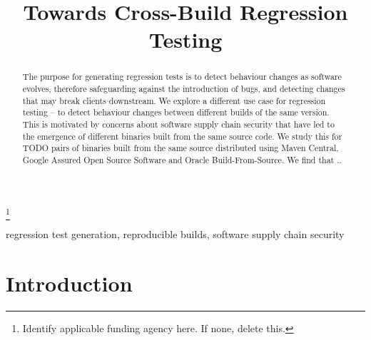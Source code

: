 \documentclass[conference]{IEEEtran}
\begin{document}
\title{Towards Cross-Build Regression Testing}
\thanks{Identify applicable funding agency here. If none, delete this.}

\author{
\and
{}
\and
{}
}

\maketitle

\begin{abstract}
	The purpose for generating regression tests is to detect behaviour changes as software evolves, therefore safeguarding against the introduction of bugs, and detecting changes that may break  clients downstream. We explore a different use case for regression testing – to detect behaviour changes  between different builds of the same version. This is motivated by concerns about software supply chain security that have led to the emergence of different binaries built from the same source code. We study this for TODO pairs of binaries built from the same source distributed using Maven Central, Google Assured Open Source Software and Oracle Build-From-Source. 
We find that ..

\end{abstract}

\begin{IEEEkeywords}
regression test generation, reproducible builds, software supply chain security
\end{IEEEkeywords}

\section{Introduction}
\end{document}
